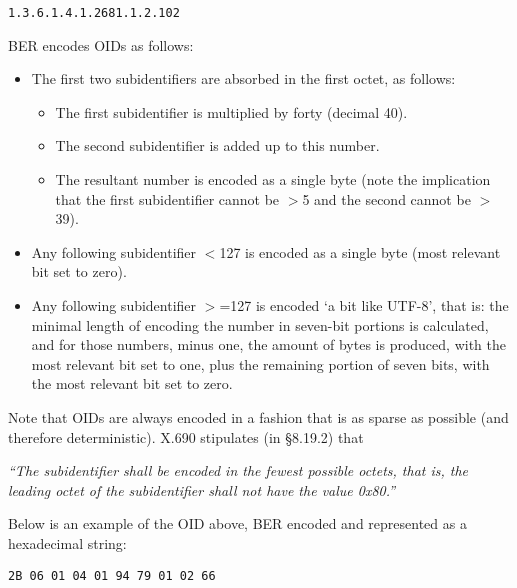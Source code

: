\begin{changemargin}{-60mm}{0mm}
\begin{myquote}
\begin{verbatim}
1.3.6.1.4.1.2681.1.2.102
\end{verbatim}
\end{myquote}
\end{changemargin}

BER encodes OIDs as follows:
\begin{itemize}
    \item The first two subidentifiers are absorbed in the first octet, as 
follows:
    \begin{itemize}
        \item The first subidentifier is multiplied by forty (decimal 40).
        \item The second subidentifier is added up to this number.
        \item The resultant number is encoded as a single byte (note the 
implication that the first subidentifier cannot be $>$5 and the second 
cannot be $>$39).
    \end{itemize}
    \item Any following subidentifier $<$127 is encoded as a single byte (most 
relevant bit set to zero).
    \item Any following subidentifier $>$=127 is encoded ‘a bit like 
UTF-8’, that is: the minimal length of encoding the number in seven-bit 
portions is calculated, and for those numbers, minus one, the amount of 
bytes is produced, with the most relevant bit set to one, plus the 
remaining portion of seven bits, with the most relevant bit set to zero.
\end{itemize}

Note that OIDs are always encoded in a fashion that is as sparse as 
possible (and therefore deterministic). X.690 \cite{bib:x690} stipulates (in 
§8.19.2) that

\textit{“The subidentifier shall be encoded in the fewest 
possible octets, that is, the leading octet of the subidentifier shall not 
have the value 0x80.”}

Below is an example of the OID above, BER encoded and represented as
a hexadecimal string:

\begin{changemargin}{-60mm}{0mm}
\begin{myquote}
\begin{verbatim}
2B 06 01 04 01 94 79 01 02 66
\end{verbatim}
\end{myquote}
\end{changemargin}

